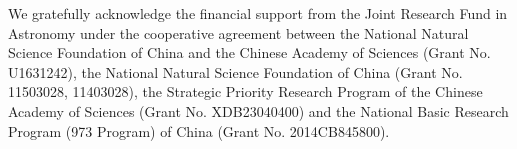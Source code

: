 \documentclass{raa}
\begin{document}
\begin{acknowledgements}
We gratefully acknowledge the financial support from the Joint Research Fund in Astronomy under the cooperative agreement between the National Natural Science Foundation of China and the Chinese Academy of Sciences (Grant No. U1631242), the National Natural Science Foundation of China (Grant No. 11503028, 11403028), the Strategic Priority Research Program of the Chinese Academy of Sciences (Grant No. XDB23040400) and the National Basic Research Program (973 Program) of China (Grant No. 2014CB845800).
\end{acknowledgements}



\end{document}
